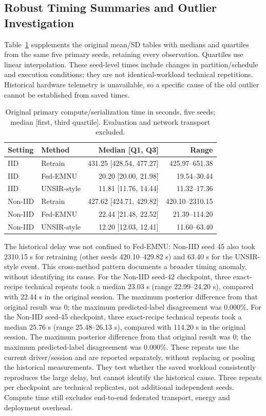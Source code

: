 \documentclass[software,article,submit,moreauthors]{Definitions/mdpi}
\begin{document}
\subsection{Robust Timing Summaries and Outlier Investigation}
\label{sec:round2-timing}
Table~\ref{tab:robust-time} supplements the original mean/SD tables with medians
and quartiles from the same five primary seeds, retaining every observation.
Quartiles use linear interpolation. These seed-level times include changes in
partition/schedule and execution conditions; they are not identical-workload
technical repetitions. Historical hardware telemetry is unavailable, so a
specific cause of the old outlier cannot be established from saved times.
\begin{table}[H]\centering\small
\caption{Original primary compute/serialization time in seconds, five seeds;
median [first, third quartile]. Evaluation and network transport excluded.}
\label{tab:robust-time}\begin{tabular}{llrr}\toprule
Setting & Method & Median [Q1, Q3] & Range\\\midrule
IID & Retrain & 431.25 [428.54, 477.27] & 425.97--651.38\\
IID & Fed-EMNU & 20.20 [20.00, 21.98] & 19.54--30.44\\
IID & UNSIR-style & 11.81 [11.76, 14.44] & 11.32--17.36\\
Non-IID & Retrain & 427.62 [424.71, 429.82] & 420.10--2310.15\\
Non-IID & Fed-EMNU & 22.44 [21.48, 22.52] & 21.39--114.20\\
Non-IID & UNSIR-style & 12.20 [12.03, 12.41] & 11.60--63.40\\
\bottomrule\end{tabular}\end{table}
The historical delay was not confined to Fed-EMNU: Non-IID seed 45 also
took 2310.15 s for retraining (other seeds 420.10--429.82 s)
and 63.40 s for the UNSIR-style event. This cross-method pattern
documents a broader timing anomaly, without identifying its cause.
For the Non-IID seed-42 checkpoint, three exact-recipe technical repeats
took a median 23.03 s (range 22.99--24.20 s),
compared with 22.44 s in the original session.
The maximum posterior difference from that original result was 0;
the maximum predicted-label disagreement was 0.000\%.
For the Non-IID seed-45 checkpoint, three exact-recipe technical repeats
took a median 25.76 s (range 25.48--26.13 s),
compared with 114.20 s in the original session.
The maximum posterior difference from that original result was 0;
the maximum predicted-label disagreement was 0.000\%.
These repeats use the current driver/session and are reported separately,
without replacing or pooling the historical measurements. They test whether
the saved workload consistently reproduces the large delay, but cannot identify
the historical cause. Three repeats per checkpoint are technical replicates,
not additional independent seeds. Compute time still excludes end-to-end
federated transport, energy and deployment overhead.
\end{document}
